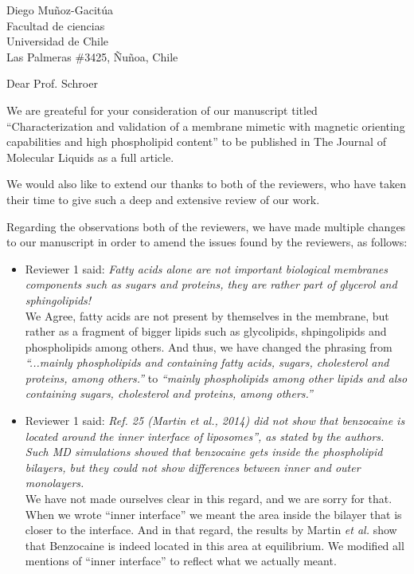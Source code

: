 \documentclass{letter}
\begin{document}
\begin{letter}{Diego Muñoz-Gacitúa\\ Facultad de ciencias \\ Universidad de
    Chile \\ Las Palmeras \#3425, Ñuñoa, Chile}
  
  \opening{Dear Prof. Schroer}
  
  We are greateful for your consideration of our manuscript titled
  ``Characterization and validation of a membrane mimetic with magnetic
  orienting capabilities and high phospholipid content'' to be published in The
  Journal of Molecular Liquids as a full article.
  
  We would also like to extend our thanks to both of the reviewers, who have
  taken their time to give such a deep and extensive review of our work.
  
  Regarding the observations both of the reviewers, we have made multiple changes to
  our manuscript in order to amend the issues found by the reviewers, as
  follows:
  
  \begin{itemize}
  \item Reviewer 1 said: \textit{Fatty acids alone are not important biological membranes components such as sugars and proteins, they are rather part of glycerol and sphingolipids!}\\
    We Agree, fatty acids are not present by themselves in the membrane, but
    rather as a fragment of bigger lipids such as glycolipids, shpingolipids and
    phospholipids among others. And thus, we have changed the phrasing from
    \textit{``...mainly phospholipids and containing fatty acids, sugars,
      cholesterol and proteins, among others.''} to \textit{``mainly phospholipids among other lipids and
      also containing sugars, cholesterol and proteins, among others.''}
    
  \item Reviewer 1 said: \textit{Ref. 25 (Martin et al., 2014) did not show that benzocaine is located around the inner interface of liposomes”, as stated by the authors. Such MD simulations showed that benzocaine gets inside the phospholipid bilayers, but they could not show differences between inner and outer monolayers.}\\
    We have not made ourselves clear in this regard, and we are sorry for that. When we wrote ``inner
    interface'' we meant the area inside the bilayer that is closer to the
    interface. And in that regard, the results by Martin \textit{et al.} show
    that Benzocaine is indeed located in this area at equilibrium. We modified
    all mentions of ``inner interface'' to reflect what we actually meant.
    

\end{itemize}
\end{letter}
\end{document}
